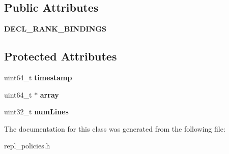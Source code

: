 \subsection*{Public Attributes}
\begin{DoxyCompactItemize}
\item 
\hypertarget{classLRUReplPolicy_a5ccee6aca3822b36fe38b89c3ce198b7}{{\bfseries D\-E\-C\-L\-\_\-\-R\-A\-N\-K\-\_\-\-B\-I\-N\-D\-I\-N\-G\-S}}\label{classLRUReplPolicy_a5ccee6aca3822b36fe38b89c3ce198b7}

\end{DoxyCompactItemize}
\subsection*{Protected Attributes}
\begin{DoxyCompactItemize}
\item 
\hypertarget{classLRUReplPolicy_a65b4e89421966a1190dbff428fc5ea06}{uint64\-\_\-t {\bfseries timestamp}}\label{classLRUReplPolicy_a65b4e89421966a1190dbff428fc5ea06}

\item 
\hypertarget{classLRUReplPolicy_a352504fa2cf1d16cd51d3c27d88dc32f}{uint64\-\_\-t $\ast$ {\bfseries array}}\label{classLRUReplPolicy_a352504fa2cf1d16cd51d3c27d88dc32f}

\item 
\hypertarget{classLRUReplPolicy_a1390ad4fdead8484451baebc26d1bdfb}{uint32\-\_\-t {\bfseries num\-Lines}}\label{classLRUReplPolicy_a1390ad4fdead8484451baebc26d1bdfb}

\end{DoxyCompactItemize}


The documentation for this class was generated from the following file\-:\begin{DoxyCompactItemize}
\item 
repl\-\_\-policies.\-h\end{DoxyCompactItemize}
